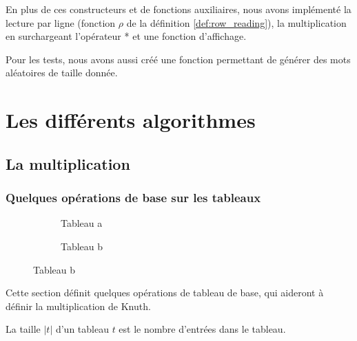 En plus de ces constructeurs et de fonctions auxiliaires, nous avons implémenté la lecture par ligne (fonction $\rho$ de la définition \ref{def:row_reading}), la multiplication en surchargeant l'opérateur * et une fonction d'affichage.

Pour les tests, nous avons aussi créé une fonction permettant de générer des mots aléatoires de taille donnée.

\section{Les différents algorithmes}

\subsection{La multiplication} \label{subsect:mult}

\subsubsection{Quelques opérations de base sur les tableaux}

\begin{figure}[!ht]
	\centering
	\begin{subfigure}[b]{0.4\linewidth}
		\centering
		\caption{Tableau a}
		\label{fig:tab2}
	\end{subfigure}
	\begin{subfigure}[b]{0.4\linewidth}
		\centering
		\caption{Tableau b}
		\label{fig:tab3}
	\end{subfigure}
	\label{fig:tabs1}
\end{figure}
Cette section définit quelques opérations de tableau de base, qui aideront à définir la multiplication de Knuth.
\begin{definition}[taille]
	La taille $|t|$ d'un tableau $t$ est le nombre d'entrées dans le tableau.
\end{definition}
 
